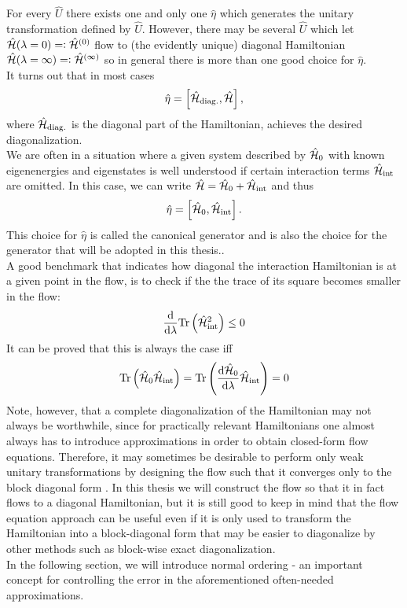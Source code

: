 For every $\hat U$ there exists one and only one $\hat\eta$ which generates the unitary transformation defined by $\hat U$. However, there may be several $\hat U$ which let $\hat{\mathcal{H}}(\lambda = 0)=\vcentcolon \hat{\mathcal{H}}^{(0)}$ flow to (the evidently unique) diagonal Hamiltonian $\hat{\mathcal{H}}(\lambda=\infty)=\vcentcolon \hat{\mathcal{H}}^{(\infty)}$ so in general there is more than one good choice for $\hat\eta$. \\
It turns out that in most cases 
\begin{equation}\label{FEQ_eta_def}
\hat\eta = \left[\hat{\mathcal{H}}_{\mathrm{diag.}},\hat{\mathcal{H}} \right],
\end{equation}
where $\hat{\mathcal{H}}_{\mathrm{diag.}}$ is the diagonal part of the Hamiltonian, achieves the desired diagonalization.  \\
We are often in a situation where a given system described by $\hat{\mathcal{H}}_0$ with known eigenenergies  and eigenstates is well understood if certain interaction terms $\hat{\mathcal{H}}_{\mathrm{int}}$ are omitted. In this case, we can write $\hat{\mathcal{H}} = \hat{\mathcal{H}}_0 + \hat{\mathcal{H}}_{\mathrm{int}}$ and thus
\begin{equation}\label{FEQ_can_eta_def}
\hat\eta = \left[\hat{\mathcal{H}}_0, \hat{\mathcal{H}}_{\mathrm{int}}\right].
\end{equation}
This choice for $\hat \eta$ is called the canonical generator and is also the choice for the generator that will be adopted in this thesis.. \\
A good benchmark that indicates how diagonal the interaction Hamiltonian is at a given point in the flow, is to check if the the trace of its square becomes smaller in the flow:
\begin{equation}\label{check_trace}
\frac{\mathrm d}{\mathrm d \lambda}\mathrm{Tr}\left(\hat{\mathcal{H}}^2_{\mathrm{int}}\right)\leq 0
\end{equation}
It can be proved \cite[pp. 27-28]{kehrein2006flow} that this is always the case iff 
\begin{align}\label{useless_check}
\mathrm{Tr}\left(\hat{\mathcal{H}}_0\hat{\mathcal{H}}_{\mathrm{int}}\right)=\mathrm{Tr}\left(\frac{\mathrm d\hat{\mathcal{H}}_0}{\mathrm d\lambda} \hat{\mathcal{H}}_{\mathrm{int}}\right)=0
\end{align}
Note, however, that a complete diagonalization of the Hamiltonian may not always be worthwhile, since for practically relevant Hamiltonians one almost always has to introduce approximations in order to obtain closed-form flow equations. Therefore, it may sometimes be desirable to perform only weak unitary transformations by designing the flow such that it converges only to the block diagonal form \cite{Wegner_2006}. In this thesis we will construct the flow so that it in fact flows to a diagonal Hamiltonian, but it is still good to keep in mind that the flow equation approach can be useful even if it is only used to transform the Hamiltonian into a block-diagonal form that may be easier to diagonalize by other methods such as block-wise exact diagonalization.\\ 
In the following section, we will introduce normal ordering - an important concept for controlling the error in the aforementioned often-needed approximations.
